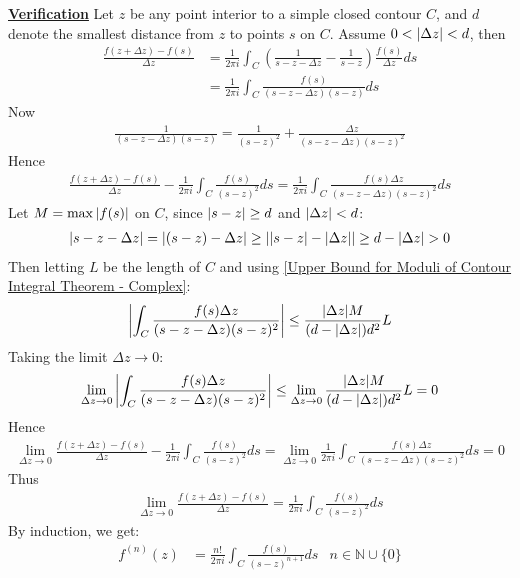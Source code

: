 \documentclass[12pt, english]{book}
\makeatletter
\renewenvironment{proof}[1][\proofname]{\par
	\pushQED{\qed}%
	\normalfont \topsep6\p@\@plus6\p@\relax
	\list{}{%
		\settowidth{\leftmargin}{\itshape\proofname:\hskip\labelsep}%
		\setlength{\labelwidth}{0pt}%
		\setlength{\itemindent}{-\leftmargin}%
	}%
	\item[\hskip\labelsep\itshape#1\@addpunct{:}]\ignorespaces
}{%
	\popQED\endlist\@endpefalse
}
\makeatother
\begin{document}
\begin{proof}
		\underline{\textbf{Verification}} \newline
		Let \(z\) be any point interior to a simple closed contour \(C\), and \(d\) denote the smallest distance from \(z\) to points \(s\) on \(C\). Assume \(0 < \abs{\Delta z} < d\), then 
		\begin{align*}
			\frac{f(z + \Delta z) - f(s)}{\Delta z} 
			&= \frac{1}{2 \pi i} \int_{C} \left(\frac{1}{s - z - \Delta z} - \frac{1}{s - z}\right) \frac{f(s)}{\Delta z} ds \\
			&= \frac{1}{2\pi i} \int_{C} \frac{f(s)}{(s - z - \Delta z)(s-z)} ds
		\end{align*}
		Now
		\begin{align*}
			\frac{1}{(s-z-\Delta z)(s-z)} = \frac{1}{(s-z)^2} + \frac{\Delta z}{(s-z-\Delta z)(s-z)^2}
		\end{align*}
		Hence
		\begin{align*}
			\frac{f(z + \Delta z) - f(s)}{\Delta z} - \frac{1}{2\pi i} \int_{C} \frac{f(s)}{(s-z)^2} ds = \frac{1}{2\pi i} \int_{C} \frac{f(s)\Delta z}{(s-z-\Delta z)(s-z)^2} ds
		\end{align*}
		Let \(M = \max{\abs{f(s)}}\) on \(C\), since \(\abs{s-z} \geq d\) and \(\abs{\Delta z}<d\):
		\begin{align*}
			\abs{s-z-\Delta z} = \abs{(s-z) - \Delta z} \geq \abs{\abs{s-z} - \abs{\Delta z}} \geq d - \abs{\Delta z} > 0
		\end{align*}
		Then letting \(L\) be the length of \(C\) and using \cref{Upper Bound for Moduli of Contour Integral Theorem - Complex}:
		\begin{align*}
			\abs{\int_{C} \frac{f(s) \Delta z}{(s-z-\Delta z)(s-z)^2}} 
			\leq \frac{\abs{\Delta z} M}{(d - \abs{\Delta z}) d^2} L
		\end{align*}
		Taking the limit \(\Delta z \rightarrow 0\):
		\begin{align*}
			\lim_{\Delta z \rightarrow 0} \abs{\int_{C} \frac{f(s) \Delta z}{(s-z-\Delta z)(s-z)^2}} 
			\leq  \lim_{\Delta z \rightarrow 0} \frac{\abs{\Delta z} M}{(d - \abs{\Delta z}) d^2} L = 0
		\end{align*}
		Hence
		\begin{align*}
			\lim_{\Delta z \rightarrow 0} \frac{f(z + \Delta z) - f(s)}{\Delta z} - \frac{1}{2\pi i} \int_{C} \frac{f(s)}{(s-z)^2} ds 
			= \lim_{\Delta z \rightarrow 0} \frac{1}{2\pi i} \int_{C} \frac{f(s)\Delta z}{(s-z-\Delta z)(s-z)^2} ds = 0
		\end{align*}
		Thus 
		\begin{align*}
			\lim_{\Delta z \rightarrow 0} \frac{f(z + \Delta z) 
			- f(s)}{\Delta z} = \frac{1}{2\pi i} \int_{C} \frac{f(s)}{(s-z)^2} ds 
		\end{align*}
		By induction, we get: 
		\begin{align*}
			f^{(n)}(z) &= \frac{n!}{2 \pi i} \int_{C} \frac{f(s)}{(s-z)^{n+1}} ds 
				& n \in \mathbb{N} \cup \{0\}
		\end{align*}
	\end{proof}
	
\end{document}
